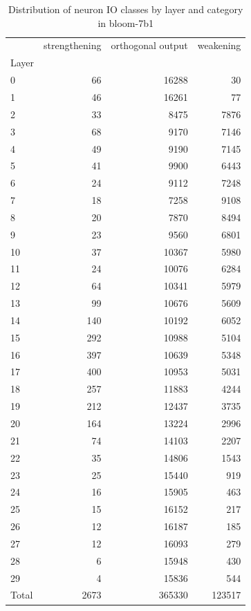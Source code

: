\begin{table}
\caption{Distribution of neuron IO classes by layer and category in bloom-7b1}
\label{tab:bloom-7b1}
\begin{tabular}{lrrr}
 & strengthening & orthogonal output & weakening \\
Layer &  &  &  \\
0 & 66 & 16288 & 30 \\
1 & 46 & 16261 & 77 \\
2 & 33 & 8475 & 7876 \\
3 & 68 & 9170 & 7146 \\
4 & 49 & 9190 & 7145 \\
5 & 41 & 9900 & 6443 \\
6 & 24 & 9112 & 7248 \\
7 & 18 & 7258 & 9108 \\
8 & 20 & 7870 & 8494 \\
9 & 23 & 9560 & 6801 \\
10 & 37 & 10367 & 5980 \\
11 & 24 & 10076 & 6284 \\
12 & 64 & 10341 & 5979 \\
13 & 99 & 10676 & 5609 \\
14 & 140 & 10192 & 6052 \\
15 & 292 & 10988 & 5104 \\
16 & 397 & 10639 & 5348 \\
17 & 400 & 10953 & 5031 \\
18 & 257 & 11883 & 4244 \\
19 & 212 & 12437 & 3735 \\
20 & 164 & 13224 & 2996 \\
21 & 74 & 14103 & 2207 \\
22 & 35 & 14806 & 1543 \\
23 & 25 & 15440 & 919 \\
24 & 16 & 15905 & 463 \\
25 & 15 & 16152 & 217 \\
26 & 12 & 16187 & 185 \\
27 & 12 & 16093 & 279 \\
28 & 6 & 15948 & 430 \\
29 & 4 & 15836 & 544 \\
Total & 2673 & 365330 & 123517 \\
\end{tabular}
\end{table}
